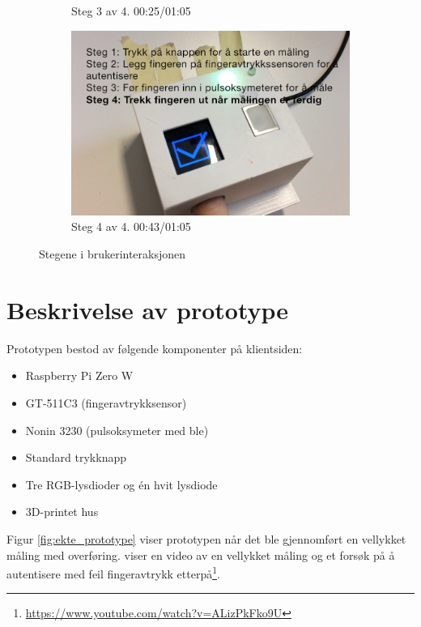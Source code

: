 \begin{figure}
\begin{subfigure}{.5\textwidth}
  \caption{Steg 3 av 4. 00:25/01:05}
  \label{fig:steg3}
\end{subfigure}%
\begin{subfigure}{.5\textwidth}
  \includegraphics[width=1.0\linewidth]{fig/prototype/steg4}
  \caption{Steg 4 av 4. 00:43/01:05}
  \label{fig:steg4}
\end{subfigure}
\caption{Stegene i brukerinteraksjonen \citep{youtube}}
\label{fig:brukerinteraksjonen}
\end{figure}

\section{Beskrivelse av prototype}
Prototypen bestod av følgende komponenter på klientsiden:

\begin{itemize}
  \item Raspberry Pi Zero W
  \item GT-511C3 (fingeravtrykksensor)
  \item Nonin 3230 (pulsoksymeter med \gls{ble})
  \item Standard trykknapp
  \item Tre RGB-lysdioder og én hvit lysdiode
  \item 3D-printet hus
\end{itemize}

Figur \ref{fig:ekte_prototype} viser prototypen når det ble gjennomført en vellykket
måling med overføring. \citet{youtube} viser en video av en vellykket måling og et forsøk på å autentisere med feil
fingeravtrykk etterpå\footnote{\url{https://www.youtube.com/watch?v=ALizPkFko9U}}.

